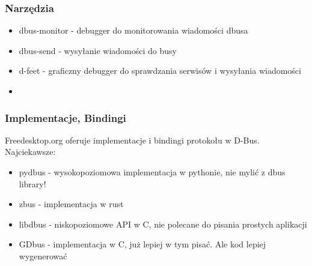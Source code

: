 \begin{frame}
    \frametitle{Narzędzia}
    \begin{itemize}
        \item dbus-monitor - debugger do monitorowania wiadomości dbusa
        \item dbus-send - wysyłanie wiadomości do busy
        \item d-feet - graficzny debugger do sprawdzania
        serwisów i wysyłania wiadomości
        \item 
    \end{itemize}
\end{frame}

\begin{frame}
    \frametitle{Implementacje, Bindingi}
    Freedesktop.org oferuje implementacje i bindingi protokołu w D-Bus. Najciekawsze:
    \begin{itemize}
        \item pydbus - wysokopoziomowa implementacja w pythonie, nie mylić z dbus library!
        \item zbus - implementacja w rust
        \item libdbus - niskopoziomowe API w C, nie polecane do pisania 
        prostych aplikacji
        \item GDbus - implementacja w C, już lepiej w tym pisać.
        Ale kod lepiej wygenerować
    \end{itemize}
\end{frame}